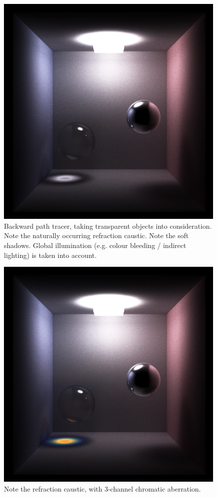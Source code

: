 \documentclass[12pt]{article}
\begin{document}
\begin{figure} 
\centering
  \includegraphics[width = 6 in]{v_rt_reflect_no_chromatic_aberration_low_res.png}
  \caption{  Backward path tracer, taking transparent objects into consideration. 
Note the naturally occurring refraction caustic.
Note the soft shadows.
Global illumination (e.g. colour bleeding / indirect lighting) is taken into account.
}
\end{figure}


\begin{figure} 
\centering
  \includegraphics[width = 6 in]{v_rt_reflect_chromatic_aberration_low_res.png}
  \caption{ Note the refraction caustic, with 3-channel chromatic aberration.
}
\end{figure}
\end{document}
